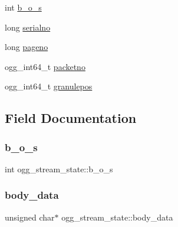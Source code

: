 \begin{DoxyCompactItemize}
\item 
int \hyperlink{structogg__stream__state_a76fcc3bf6a59eff87ec3bee1d16fa0b5}{b\+\_\+o\+\_\+s}
\item 
long \hyperlink{structogg__stream__state_a79248e3f1f41cde5331909e8edd98e10}{serialno}
\item 
long \hyperlink{structogg__stream__state_a0ad3315203fcebdc2ccd3b050d28a65c}{pageno}
\item 
ogg\+\_\+int64\+\_\+t \hyperlink{structogg__stream__state_a1bebf380025b6ca0841497e7ab2b5c34}{packetno}
\item 
ogg\+\_\+int64\+\_\+t \hyperlink{structogg__stream__state_a5df750c600660686e29f24b4d1ce836c}{granulepos}
\end{DoxyCompactItemize}


\subsection{Field Documentation}
\mbox{\label{structogg__stream__state_a76fcc3bf6a59eff87ec3bee1d16fa0b5}} 
\subsubsection{\texorpdfstring{b\+\_\+o\+\_\+s}{b\_o\_s}}
{\footnotesize\ttfamily int ogg\+\_\+stream\+\_\+state\+::b\+\_\+o\+\_\+s}

\mbox{\label{structogg__stream__state_a70d03b6f99c1d1e57f55e800b087dae8}} 
\subsubsection{\texorpdfstring{body\+\_\+data}{body\_data}}
{\footnotesize\ttfamily unsigned char$\ast$ ogg\+\_\+stream\+\_\+state\+::body\+\_\+data}

\mbox{\label{structogg__stream__state_a19d45a7b5004f13ae02b5a9502354b93}} 

